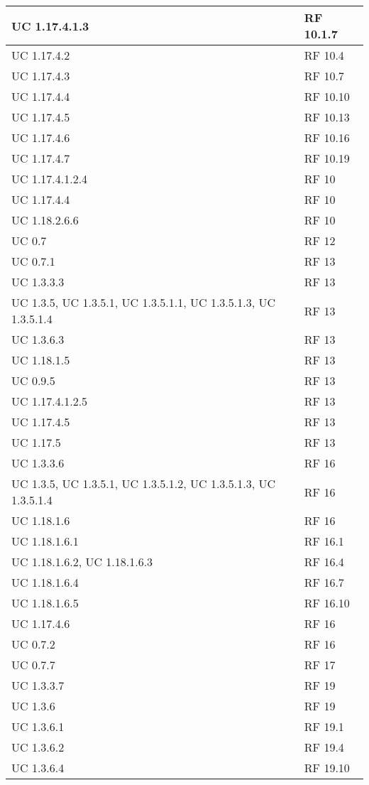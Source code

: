 {\begin{longtable} [c]{| p{4cm} | p{4cm} |}
 \hline 
UC 1.17.4.1.3 & RF 10.1.7\\ 
 \hline 
UC 1.17.4.2 & RF 10.4\\ 
 \hline 
UC 1.17.4.3 & RF 10.7\\ 
 \hline 
UC 1.17.4.4 & RF 10.10\\ 
 \hline 
UC 1.17.4.5 & RF 10.13\\ 
 \hline 
UC 1.17.4.6 & RF 10.16\\ 
 \hline 
UC 1.17.4.7 & RF 10.19\\ 
 \hline 
UC 1.17.4.1.2.4 & RF 10\\ 
 \hline 
UC 1.17.4.4 & RF 10\\ 
 \hline 
UC 1.18.2.6.6 & RF 10\\ 
 \hline 
UC 0.7 & RF 12\\ 
 \hline 
UC 0.7.1 & RF 13\\ 
 \hline 
UC 1.3.3.3 & RF 13\\ 
 \hline 
UC 1.3.5, UC 1.3.5.1, UC 1.3.5.1.1, UC 1.3.5.1.3, UC 1.3.5.1.4 & RF 13\\ 
 \hline 
UC 1.3.6.3 & RF 13\\ 
 \hline 
UC 1.18.1.5 & RF 13\\ 
 \hline 
UC 0.9.5 & RF 13\\ 
 \hline 
UC 1.17.4.1.2.5 & RF 13\\ 
 \hline 
UC 1.17.4.5 & RF 13\\ 
 \hline 
UC 1.17.5 & RF 13\\ 
 \hline 
UC 1.3.3.6 & RF 16\\ 
 \hline 
UC 1.3.5, UC 1.3.5.1, UC 1.3.5.1.2, UC 1.3.5.1.3, UC 1.3.5.1.4 & RF 16\\ 
 \hline 
UC 1.18.1.6 & RF 16\\ 
 \hline 
UC 1.18.1.6.1 & RF 16.1\\ 
 \hline 
UC 1.18.1.6.2, UC 1.18.1.6.3 & RF 16.4\\ 
 \hline 
UC 1.18.1.6.4 & RF 16.7\\ 
 \hline 
UC 1.18.1.6.5 & RF 16.10\\ 
 \hline 
UC 1.17.4.6 & RF 16\\ 
 \hline 
UC 0.7.2 & RF 16\\ 
 \hline 
UC 0.7.7 & RF 17\\ 
 \hline 
UC 1.3.3.7 & RF 19\\ 
 \hline 
UC 1.3.6 & RF 19\\ 
 \hline 
UC 1.3.6.1 & RF 19.1\\ 
 \hline 
UC 1.3.6.2 & RF 19.4\\ 
 \hline 
UC 1.3.6.4 & RF 19.10\\ 

\end{longtable}}
